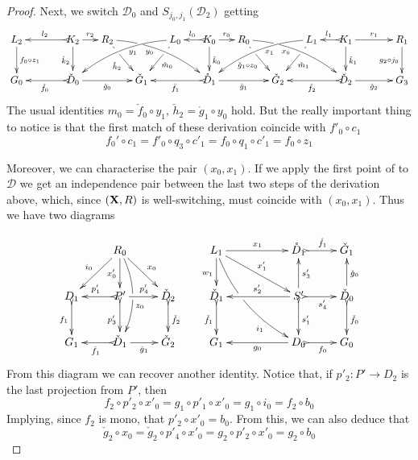 \documentclass[a4paper,UKenglish,cleveref,pdftex,thm-restate,numberwithinsect]{lipics-v2021}
\def\R{\mathsf{R}}
\def\X{\textbf {\textup{X}}}
\def\G{\textbf {\textup{G}}}
\newcommand{\dder}[1]{\mathscr{#1}}
\begin{document}
\begin{proof}
	Next, we switch $\dder{D}_0$ and $S_{j_0, j_1}(\dder{D}_2)$ getting
	\[\xymatrix@C=15pt{L_2\ar[d]^{f_0\circ z_1}&& K_2 \ar[d]_{\mathring{k}_2}\ar@{>->}[ll]_{l_2} \ar[r]^{r_2} & R_2 \ar@/^.35cm/[drrr]_(.4){y_0}|(.29)\hole \ar[dr]|(.28)\hole_{\mathring{h}_2} && L_0 \ar@/_.35cm/[dlll]^(.4){y_1} \ar[dl]|(.28)\hole^{\check{m}_0}& K_0 \ar[d]^{\check{k}_0}\ar@{>->}[l]_{l_0} \ar[r]^{r_0} & R_0 \ar[dr]|(.28)\hole_{\check{g}_1\circ z_0} \ar@/^.35cm/[drrr]_(.4){x_0}|(.29)\hole  && L_1 \ar@/_.35cm/[dlll]^(.4){x_1} \ar[dl]|(.28)\hole^{\check{m}_1}& K_1 \ar[d]^{\check{k}_1}\ar@{>->}[l]_{l_1} \ar[rr]^{r_1} && R_1\ar[d]_{g_2\circ j_0} \\G_0 && \ar@{>->}[ll]^{\check{f}_0} \check{D}_0 \ar[rr]_{\check{g}_0}&& \check{G}_1  && \ar@{>->}[ll]^{\mathring{f}_1} \mathring{D}_1 \ar[rr]_{\mathring{g}_1}&& \check{G}_2 && \ar@{>->}[ll]^{\check{f}_2} \check{D}_2 \ar[rr]_{\check{g}_2}&& G_3 }\]
	The usual identities $m_0=\check{f}_0\circ y_1$, $\check{h}_2=\mathring{g}_1\circ y_0$ hold. But the really important thing to notice is that the first match of these derivation coincide with $f'_0\circ c_1$
	\[	f_0'\circ c_1  =f'_0\circ q_3\circ c'_1 =f_0\circ q_1\circ c'_1=f_0\circ z_1\]
	
	Moreover, we can characterise the pair $(x_0, x_1)$. If we apply the first point of  to $\dder{D}$ we get an independence pair between the last two steps of the derivation above, which, since $(\X, \R)$ is well-switching, must coincide with $(x_0, x_1)$. Thus we have two diagrams
	
	\[\xymatrix{&R_0 \ar[dl]_{i_0} \ar@{>}[dr]^{x_0} \ar@/^.4cm/[dd]|\hole^(.6){z_0}\ar[d]_{x'_0}&&L_ 1\ar[d]_{w_1} \ar@/_.4cm/[ddrr]|(.41)\hole_(.7){i_1}\ar[drr]^{x'_1} \ar@{>}[rr]^{x_1}&&\mathring{D}_1 \ar@{>->}[r]^{\mathring{f}_1}&\check{G}_1\\ D_1 \ar@{>->}[d]_{f_1}&P'\ar@{>->}[d]_{p'_3} \ar[r]^{p'_4} \ar@{>->}[l]_{p'_1}&\check{D}_2\ar@{>->}[d]^{\check{f}_2}&\check{D}_1 \ar@{>->}[d]_{\check{f}_1}&&S'\ar@{>->}[r]_{s'_4} \ar[u]_{s'_3}\ar@{>->}[d]^{s'_1} \ar[ll]_{s'_2} &\check{D}_0 \ar[u]_{\check{g}_0} \ar@{>->}[d]^{\check{f}_0}\\G_1&\check{D}_1 \ar@{>->}[l]^{\check{f}_1}\ar[r]_{\check{g}_1}& \check{G}_2&G_1 && D_0 \ar[ll]^{g_0}  \ar@{>->}[r]_{f_0}& G_0 }\]
	From this diagram we can recover another identity. Notice that, if $p'_2\colon P'\to D_2$ is the last projection from $P'$, then
	\[f_2\circ p'_2\circ x'_0=g_1\circ p'_1\circ x'_0=g_1\circ i_0=f_2\circ b_0\]
	Implying, since $f_2$ is mono, that $p'_2\circ x'_0=b_0$. From this, we can also deduce that 
	\[\check{g}_2\circ x_0=\check{g}_2\circ p'_4\circ x'_0=g_2\circ p'_2\circ x'_0=g_2\circ b_0 \]
	

\end{proof}
\end{document}

